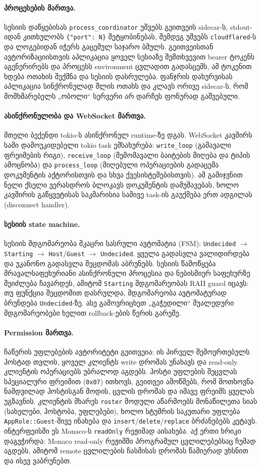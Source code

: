 \paragraph{პროცესების მართვა.}
სესიის დაწყებისას \texttt{process\_coordinator} უშვებს გეითვეის sidecar-ს,
stdout-იდან კითხულობს \texttt{\{"port": N\}} შეტყობინებას,
შემდეგ უშვებს \texttt{cloudflared}-ს და ლოგებიდან
იჭერს გაცემულ საჯარო ბმულს. გეითვეისთან ავტორიზაციისთვის აპლიკაცია ყოველ
სესიაზე შემთხვევით bearer ტოკენს აგენერირებს და პროცესს environment
ცვლადით გადასცემს, ამ ტოკენით ხდება ოთახის შექმნა და სესიის დასრულება.
ფანჯრის დახურვისას აპლიკაცია სინქრონულად შლის ოთახს და
კლავს ორივე sidecar-ს, რომ მომხმარებელს „ობოლი“ სერვერი არ დარჩეს
ფონურად გაშვებული.

\paragraph{ასინქრონულობა და WebSocket მართვა.}
მთელი ბექენდი tokio-ს ასინქრონულ runtime-ზე დგას. WebSocket კავშირს სამი
დამოუკიდებელი tokio task ემსახურება: \texttt{write\_loop} (გამავალი
ფრეიმების რიგი), \texttt{receive\_loop} (შემომავალი ბაიტების მიღება და
ტიპის ამოცნობა) და \texttt{process\_loop} (მიღებული ოპერაციების
გადაცემა დოკუმენტის აქტორისთვის და სხვა ქვესისტემებისთვის). ამ გამიჯვნით
ნელი ქსელი ვერასდროს ბლოკავს დოკუმენტის დამუშავებას, ხოლო კავშირის
გაწყვეტისას საკმარისია სამივე task-ის გაუქმება ერთ ადგილას (disconnect
handler).

\paragraph{სესიის state machine.}
სესიის მდგომარეობა მკაცრი სასრული ავტომატია (FSM):
\texttt{Undecided} $\rightarrow$ \texttt{Starting} $\rightarrow$
\texttt{Host}/\texttt{Guest} $\rightarrow$ \texttt{Undecided}. ყველა
გადასვლა ვალიდირდება და უკანონო გადასვლა შეცდომას აბრუნებს. სესიის
წამოწყება მრავალსაფეხურიანი ასინქრონული პროცესია და ნებისმიერ საფეხურზე
შეიძლება ჩავარდეს, ამიტომ \texttt{Starting} მდგომარეობას RAII guard
იცავს: თუ ფუნქცია შეცდომით დასრულდა, მდგომარეობა ავტომატურად ბრუნდება
\texttt{Undecided}-ზე. ასე გამოვრიცხეთ „გაჭედილი“ შუალედური
მდგომარეობები ხელით rollback-ების წერის გარეშე.

\paragraph{Permission მართვა.}
ჩაწერის უფლებების ავტორიტეტი გეითვეია: ის პირველ შემოერთებულს ჰოსტად
თვლის, ყოველ კლიენტს write დროშას უნახავს და read-only
კლიენტის ოპერაციებს უბრალოდ აგდებს.
ჰოსტი უფლების შეცვლას სპეციალური ფრეიმით (\texttt{0x07}) ითხოვს, გეითვეი
ამოწმებს, რომ მოთხოვნა ნამდვილად ჰოსტისგან მოდის, ცვლის დროშას და იმავე
ფრეიმს ყველას უგზავნის. კლიენტის მხარეს
\texttt{roster} მოდული აწარმოებს მონაწილეთა სიას (სახელები, ჰოსტობა,
უფლებები), ხოლო სტუმრის საკუთარი უფლება \texttt{AppRole::Guest}-შივე
ინახება და \texttt{insert}/\texttt{delete}/\texttt{replace} ბრძანებებს
კეტავს. ინტერფეისში ეს Monaco-ს \texttt{readOnly} რეჟიმად
აისახება. აქ ერთი ხრიკი დაგვჭირდა: Monaco read-only რეჟიმში პროგრამულ
ცვლილებებსაც ჩუმად აგდებს, ამიტომ remote ცვლილების ჩასმისას დროშას
წამიერად ვხსნით და ისევ ვაბრუნებთ.

